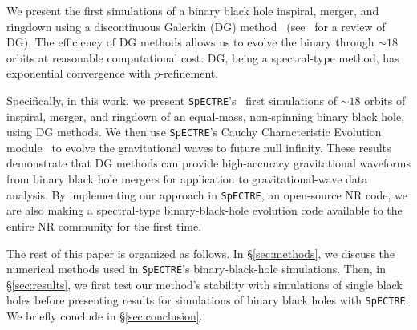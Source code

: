 \begin{bibunit}[unsrtnat]
We present the first simulations of a binary black hole inspiral, merger, and
ringdown using a discontinuous Galerkin (DG) method~\cite{reed1973triangular}
(see~\cite{Hesthaven2008} for a review of DG). The efficiency of DG methods
allows us to evolve the binary through $\sim18$ orbits at reasonable
computational cost:  DG, being a spectral-type method, has exponential
convergence with $p$-refinement. 

Specifically, in this work, we
present \texttt{SpECTRE}'s~\cite{spectrecode_2024} first simulations of $\sim18$
orbits of inspiral, merger, and ringdown of an equal-mass, non-spinning binary
black hole, using DG methods. We then use \texttt{SpECTRE}'s Cauchy
Characteristic Evolution module~ to evolve the gravitational waves to future null infinity.
These results demonstrate that DG methods can provide high-accuracy
gravitational waveforms from binary black hole mergers for application to
gravitational-wave data analysis. By implementing our approach in
\texttt{SpECTRE}, an open-source NR code, we are also making a
spectral-type binary-black-hole evolution code available to the entire
NR community for the first time.

The rest of this paper is organized as follows. In \S\ref{sec:methods}, we
discuss the numerical methods used in \texttt{SpECTRE}'s binary-black-hole
simulations. Then, in \S\ref{sec:results}, we first test our method's stability
with simulations of single black holes before presenting results for simulations
of binary black holes with \texttt{SpECTRE}. We briefly conclude in
\S\ref{sec:conclusion}.


\end{bibunit}
